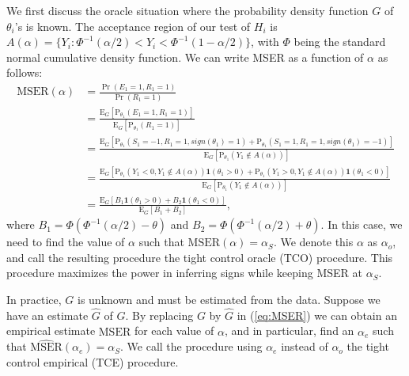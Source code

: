 \documentclass[11pt]{article}
\begin{document}
We first discuss the oracle situation where the probability density function $G$ of $\theta_i$'s is known. The acceptance region of our test of $H_i$ is $A(\alpha) = \{Y_i: \Phi^{-1}(\alpha/2)<Y_i< \Phi^{-1}(1-\alpha/2) \}$, with $\Phi$ being the standard normal cumulative density function. We can write MSER as a function of $\alpha$ as follows:
\begin{equation}
\begin{split}
\text{MSER}(\alpha) &= \frac{\Pr(E_1 = 1, R_1=1)}{\Pr(R_1=1)}   \\
& = \frac{\text{E}_G [\text{P}_{\theta_1}(E_1 = 1, R_1=1)] }{ \text{E}_G [\text{P}_{\theta_1}(R_1=1)] } \\
& =  \frac{\text{E}_G [\text{P}_{\theta_1}( S_1 = -1 , R_1 = 1, sign(\theta_1) = 1) + \text{P}_{\theta_1}( S_1 = 1 , R_1 = 1, sign(\theta_1) = -1)] }{ \text{E}_G [\text{P}_{\theta_1}(Y_1 \not \in A(\alpha) )] } \\
& =  \frac{\text{E}_G [\text{P}_{\theta_1}( Y_1 < 0 , Y_1 \not \in A(\alpha))\textbf{1}(\theta_1 > 0) +\text{P}_{\theta_1}( Y_1 > 0 , Y_1 \not \in A(\alpha))\textbf{1}(\theta_1 < 0)]  }{ \text{E}_G [\text{P}_{\theta_1}(Y_1 \not \in A(\alpha) )] }  \\
& = \frac{\text{E}_G[B_1\textbf{1}(\theta_1 > 0)+B_2\textbf{1}(\theta_1 < 0)]}{ \text{E}_G[B_1 + B_2]},
\end{split} \label{eq:MSER}
\end{equation}
where $B_1 =\Phi(\Phi^{-1}(\alpha/2)-\theta)$ and $B_2=\Phi(\Phi^{-1}(\alpha/2)+\theta)$. 
In this case, we need to find the value of $\alpha$ such that
$\text{MSER}(\alpha) = \alpha_S$.
We denote this $\alpha$ as $\alpha_o$, and call the resulting procedure the tight control oracle (TCO) procedure. This procedure maximizes the power in inferring signs while keeping MSER at $\alpha_S$. 

In practice, $G$ is unknown and must be estimated from the data. Suppose we have an estimate $\hat G$ of $G$. By replacing $G$ by $\hat G$ in (\ref{eq:MSER}) we can obtain an empirical estimate $\widehat{\text{MSER}}$ for each value of $\alpha$, 
and in particular, find an $\alpha_e$ such that 
$\widehat{\text{MSER}}(\alpha_e) = \alpha_S$. 
We call the procedure using $\alpha_e$ instead of $\alpha_o$ the tight control empirical (TCE) procedure. 
\end{document}
